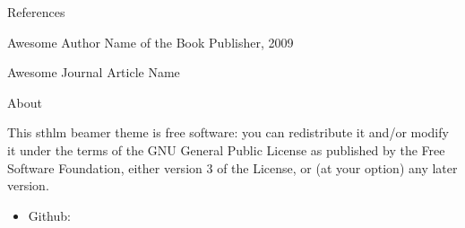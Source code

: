\documentclass[newPxFont,numfooter,sectionpages]{beamer}
\begin{document}
\begin{frame}{References}
	\begin{thebibliography}{10}

	\beamertemplatebookbibitems
	Awesome Author
	\newblock Name of the Book
	\newblock Publisher, 2009

	\beamertemplatearticlebibitems
	Awesome Journal
	\newblock Article Name

  \end{thebibliography}
\end{frame}

%
%

\begin{frame}{About}

This sthlm beamer theme is free software: you can redistribute it and/or modify
it under the terms of the GNU General Public License as published by
the Free Software Foundation, either version 3 of the License, or
(at your option) any later version.\\
\vspace{1cm}

\begin{itemize}
	\item Github: 
\end{itemize}
\end{frame}

\begingroup
{}
\begin{frame}[plain,c]


\end{frame}
\endgroup
\end{document}
